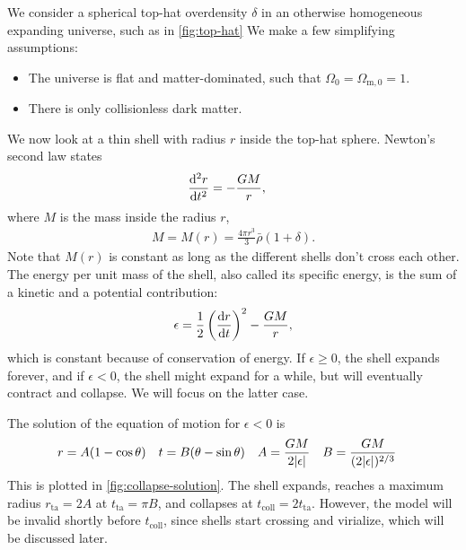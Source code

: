 We consider a spherical top-hat overdensity $\delta$ in an otherwise homogeneous expanding universe, such as in \cref{fig:top-hat}
We make a few simplifying assumptions:
\begin{itemize}
	\item The universe is flat and matter-dominated, such that $\Omega_0 = \Omega_{\text{m}, 0} = 1$.
	\item There is only collisionless dark matter.
\end{itemize}
We now look at a thin shell with radius $r$ inside the top-hat sphere. Newton's second law states
\begin{align*}
	\dv[2]{r}{t}
	&= - \frac{G M}{r},
\end{align*}
where $M$ is the mass inside the radius $r$,
\begin{align*}
	M = M(r) = \frac{4\pi r^3}{3} \bar{\rho}(1+\delta).
\end{align*}
Note that $M(r)$ is constant as long as the different shells don't cross each other.
The energy per unit mass of the shell, also called its specific energy, is the sum of a kinetic and a potential contribution:
\begin{align*}
	\epsilon = \frac{1}{2} \left( \dv{r}{t} \right)^2
	- \frac{G M}{r},
\end{align*}
which is constant because of conservation of energy.
If $\epsilon \geq 0$, the shell expands forever, and if $\epsilon < 0$, the shell might expand for a while, but will eventually contract and collapse. We will focus on the latter case.

The solution of the equation of motion for $\epsilon < 0$ is
\begin{align*}
	r &= A(1- \cos \theta) &
	t &= B(\theta - \sin\theta) &
	A &= \frac{GM}{2 \vert\epsilon\vert} &
	B &= \frac{GM}{(2 \vert\epsilon\vert)^{2/3}}
\end{align*}
This is plotted in \cref{fig:collapse-solution}. %
The shell expands, reaches a maximum radius $r_\text{ta} = 2 A$ at $t_\text{ta} = \pi B$, and collapses at $t_\text{coll} = 2 t_\text{ta}$.
However, the model will be invalid shortly before $t_\text{coll}$, since shells start crossing and virialize, which will be discussed later.



